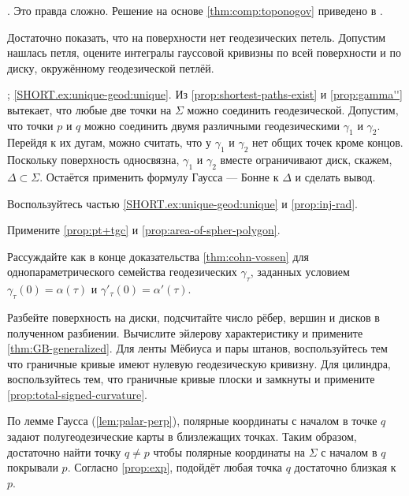 \begin{multicols}{2}
.
Это правда сложно.
Решение на основе \ref{thm:comp:toponogov} приведено в \cite{petrunin2021}.

Достаточно показать, что на поверхности нет геодезических петель.
Допустим нашлась петля, оцените интегралы гауссовой кривизны по всей поверхности и по диску, окружённому геодезической петлёй.

\parbf{\ref{ex:unique-geod}}; \ref{SHORT.ex:unique-geod:unique}.
Из \ref{prop:shortest-paths-exist} и \ref{prop:gamma''} вытекает, что любые две точки на $\Sigma$ можно соединить геодезической.
Допустим, что точки $p$ и $q$ можно соединить двумя различными геодезическими $\gamma_1$ и $\gamma_2$.
Перейдя к их дугам, можно считать, что у $\gamma_1$ и $\gamma_2$ нет общих точек кроме концов.
Поскольку поверхность односвязна, $\gamma_1$ и $\gamma_2$ вместе ограничивают диск, скажем, $\Delta\subset\Sigma$.
Остаётся применить формулу Гаусса --- Бонне к $\Delta$ и сделать вывод.

Воспользуйтесь частью \ref{SHORT.ex:unique-geod:unique} и \ref{prop:inj-rad}.

Примените \ref{prop:pt+tgc} и \ref{prop:area-of-spher-polygon}.

Рассуждайте как в конце доказательства \ref{thm:cohn-vossen} для однопараметрического семейства геодезических $\gamma_\tau$, заданных условием $\gamma_\tau(0)=\alpha(\tau)$ и $\gamma'_\tau(0)=\alpha'(\tau)$.


Разбейте поверхность на диски, подсчитайте число рёбер, вершин и дисков в полученном разбиении.
Вычислите эйлерову характеристику и примените \ref{thm:GB-generalized}.
Для ленты Мёбиуса и пары штанов, воспользуйтесь тем что граничные кривые имеют нулевую геодезическую кривизну.
Для цилиндра, воспользуйтесь тем, что граничные кривые плоски и замкнуты и примените \ref{prop:total-signed-curvature}.    



\setcounter{eqtn}{0}

По лемме Гаусса (\ref{lem:palar-perp}), полярные координаты с началом в точке $q$ задают полугеодезические карты в близлежащих точках.
Таким образом, достаточно найти точку $q\ne p$ чтобы полярные координаты на $\Sigma$ с началом в $q$ покрывали $p$.
Согласно \ref{prop:exp}, подойдёт любая точка $q$ достаточно близкая к $p$.


\end{multicols}
